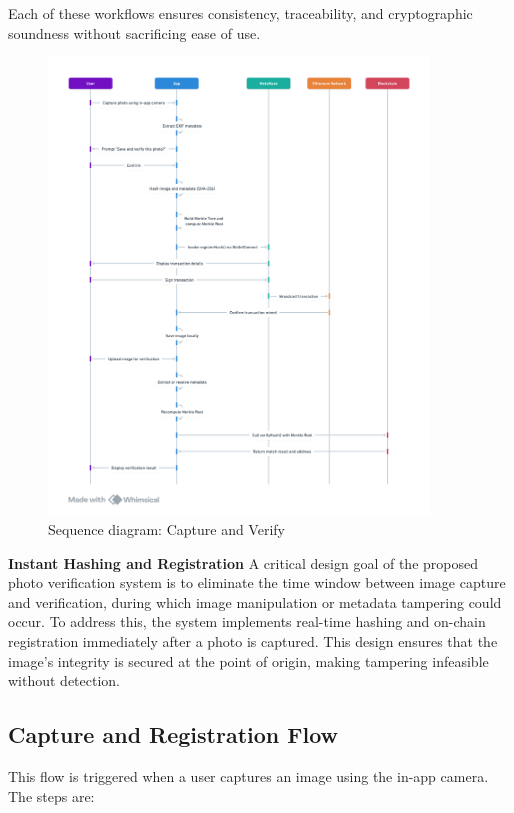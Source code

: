 Each of these workflows ensures consistency, traceability, and cryptographic soundness without sacrificing ease of use.

\begin{figure}[htb]
    \centering
    \includegraphics[width=0.90\textwidth]{images/sequenceDiagram.png}
    \caption{Sequence diagram: Capture and Verify}
    \label{fig:sequenceDiagramofCaptureAndVerify}
\end{figure}


\textbf{Instant Hashing and Registration}
A critical design goal of the proposed photo verification system is to eliminate the time window between image capture and verification, during which image manipulation or metadata tampering could occur. To address this, the system implements real-time hashing and on-chain registration immediately after a photo is captured. This design ensures that the image’s integrity is secured at the point of origin, making tampering infeasible without detection.

\subsection{Capture and Registration Flow}
This flow is triggered when a user captures an image using the in-app camera. The steps are:

